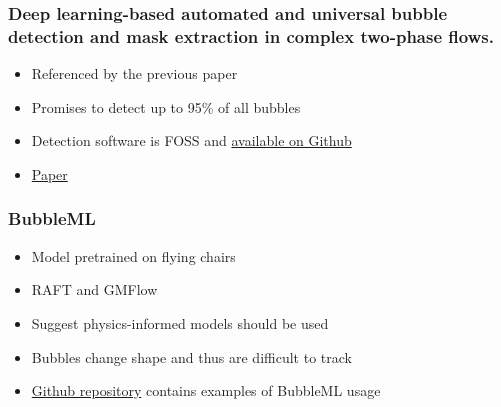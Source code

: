 \documentclass{beamer}
\begin{document}
\begin{frame}
    \frametitle{Deep learning-based automated and universal bubble detection and mask extraction in complex two-phase flows.}
    \begin{itemize}
        \item Referenced by the previous paper
        \item Promises to detect up to 95\% of all bubbles
        \item Detection software is FOSS and \href{https://github.com/ywflow/BubMask}{available on Github}
        \item \href{https://www.nature.com/articles/s41598-021-88334-0}{Paper}
    \end{itemize}
\end{frame}

\begin{frame}
    \frametitle{BubbleML}
    \begin{itemize}
        \item Model pretrained on flying chairs
        \item RAFT and GMFlow
        \item Suggest physics-informed models should be used
        \item Bubbles change shape and thus are difficult to track
        \item \href{https://github.com/HPCForge/BubbleML}{Github repository} contains examples of BubbleML usage
    \end{itemize}
\end{frame}
\end{document}
